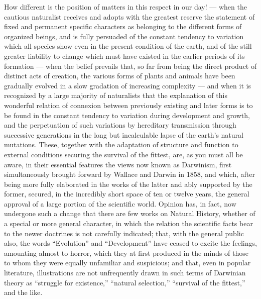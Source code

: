 \documentclass[a4paper, 11pt, oneside, english]{article}
\begin{document}
How different is the position of matters in this respect in our day! --- when the cautious naturalist receives and adopts with the greatest reserve the statement of fixed and permanent specific characters as belonging to the different forms of organized beings, and is fully persuaded of the constant tendency to variation which all species show even in the present condition of the earth, and of the still greater liability to change which must have existed in the earlier periods of its formation --- when the belief prevails that, so far from being the direct product of distinct acts of creation, the various forms of plants and animals have been gradually evolved in a slow gradation of increasing complexity --- and when it is recognized by a large majority of naturalists that the explanation of this wonderful relation of connexion between previously existing and later forms is to be found in the constant tendency to variation during development and growth, and the perpetuation of such variations by hereditary transmission through successive generations in the long but incalculable lapse of the earth's natural mutations. These, together with the adaptation of structure and function to external conditions securing the survival of the fittest, are, as you must all be aware, in their essential features the views now known as Darwinism, first simultaneously brought forward by Wallace and Darwin in 1858, and which, after being more fully elaborated in the works of the latter and ably supported by the former, secured, in the incredibly short space of ten or twelve years, the general approval of a large portion of the scientific world. Opinion has, in fact, now undergone such a change that there are few works on Natural History, whether of a special or more general character, in which the relation the scientific facts bear to the newer doctrines is not carefully indicated; that, with the general public also, the words ``Evolution'' and ``Development'' have ceased to excite the feelings, amounting almost to horror, which they at first produced in the minds of those to whom they were equally unfamiliar and suspicious; and that, even in popular literature, illustrations are not unfrequently drawn in such terms of Darwinian theory as ``struggle for existence,'' ``natural selection,'' ``survival of the fittest,'' and the like.
\end{document}
